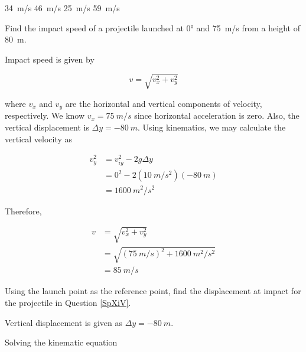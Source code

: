 \documentclass[../main-physics-problems.tex]{subfiles}
\begin{document}
\begin{questions}
\begin{randomizechoices}
    \correctchoice \SI{34}{m/s}
    \choice \SI{46}{m/s}
    \choice \SI{25}{m/s}
    \choice \SI{59}{m/s}
\end{randomizechoices}

\question \label{SpXiV}
Find the impact speed of a projectile launched at \ang{0} and \SI{75}{m/s} from a height of \SI{80}{m}.


\begin{solutionorbox}[10cm]
Impact speed is given by

\begin{equation*}
    v = \sqrt{v_x^2 + v_y^2}
\end{equation*}

where $v_x$ and $v_y$ are the horizontal and vertical components of velocity, respectively. We know $v_x = \SI{75}{m/s}$ since horizontal acceleration is zero. Also, the vertical displacement is $\Delta y = -\SI{80}{m}$. Using kinematics, we may calculate the vertical velocity as

\begin{align*}
    v_y^2 &= v_{iy}^2 - 2g \Delta y \\[1ex]
    &= 0^2 - 2\left(\SI{10}{m/s^2}\right) \left(-\SI{80}{m}\right) \\[1ex]
    &= \SI{1600}{m^2/s^2}
\end{align*}

Therefore,

\begin{align*}
    v &= \sqrt{v_x^2 + v_y^2} \\[1ex]
    &= \sqrt{\left(\SI{75}{m/s}\right)^2 + \SI{1600}{m^2/s^2}} \\[1ex]
    &= \boxed{\SI{85}{m/s}}
\end{align*}
\end{solutionorbox}

\question
Using the launch point as the reference point, find the displacement at impact for the projectile in Question \ref{SpXiV}.

\begin{solutionorbox}[5cm]
Vertical displacement is given as $\Delta y = -\SI{80}{m}$. 

Solving the kinematic equation


\end{solutionorbox}
\end{questions}
\end{document}
